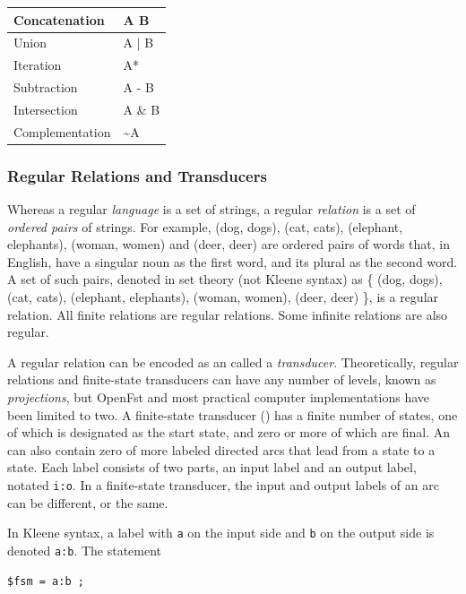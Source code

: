 \vspace{4mm}

\begin{tabular}{|l|l|}
\hline
Concatenation 	& A B \\
\hline
Union         	& A | B \\
\hline
Iteration	  	& A*\\
\hline
Subtraction		& A - B\\
\hline
Intersection	& A \& B\\
\hline
Complementation		& \~{}A\\
\hline
\end{tabular}

\subsubsection{Regular Relations and Transducers}

Whereas a regular \emph{language} is a set of strings, a regular \emph{relation}
is a set of
\emph{ordered pairs}
of strings.  For example, (dog, dogs), (cat, cats), (elephant, elephants), (woman, women)
and (deer, deer)
are ordered pairs of words that, in English, have a singular noun as the first word, and its plural
as the second word.  A set of such pairs, denoted in set theory (not Kleene syntax) as \{ (dog, dogs), (cat, cats), (elephant,
elephants), (woman, women), (deer, deer) \}, is a regular relation.  All finite relations are
regular relations.  Some infinite relations are also regular.

A regular relation can be encoded as an \fsm{} called a \emph{transducer}.  Theoretically,
regular relations and finite-state transducers can have any number of levels, known as
\emph{projections}, but OpenFst and most practical computer implementations have been limited to two.
A finite-state transducer (\fst{}) has a finite number of states, one of which is
designated as the start state, and zero or more of which are final.  An \fst{} can also
contain zero of more labeled directed arcs that lead from a state to a state.  Each label
consists of two parts, an input label and an output label, notated  \verb!i:o!.  In a finite-state
transducer, the input
and output labels of an arc can be different, or the same.

In Kleene syntax, a label with \texttt{a} on the input side and \texttt{b} on the output
side is denoted \texttt{a:b}.  The statement


\begin{Verbatim}
$fsm = a:b ;
\end{Verbatim}

